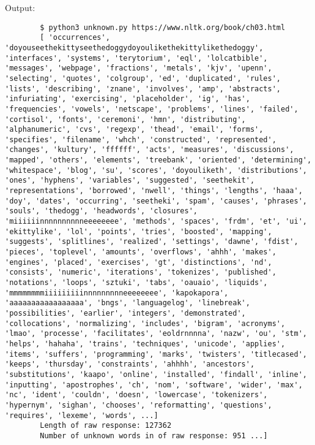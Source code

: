 \documentclass[12pt]{article}
\begin{document}
		Output:
		\begin{lstlisting}
		$ python3 unknown.py https://www.nltk.org/book/ch03.html
		[ 'occurrences', 'doyouseethekittyseethedoggydoyoulikethekittylikethedoggy', 'interfaces', 'systems', 'terytorium', 'eql', 'lolcatbible', 'messages', 'webpage', 'fractions', 'metals', 'kjv', 'upenn', 'selecting', 'quotes', 'colgroup', 'ed', 'duplicated', 'rules', 'lists', 'describing', 'znane', 'involves', 'amp', 'abstracts', 'infuriating', 'exercising', 'placeholder', 'ig', 'has', 'frequencies', 'vowels', 'netscape', 'problems', 'lines', 'failed', 'cortisol', 'fonts', 'ceremoni', 'hmn', 'distributing', 'alphanumeric', 'cvs', 'regexp', 'thead', 'email', 'forms', 'specifies', 'filename', 'whch', 'constructed', 'represented', 'changes', 'kultury', 'ffffff', 'acts', 'measures', 'discussions', 'mapped', 'others', 'elements', 'treebank', 'oriented', 'determining', 'whitespace', 'blog', 'su', 'scores', 'doyouliketh', 'distributions', 'ones', 'hyphens', 'variables', 'suggested', 'seethekit', 'representations', 'borrowed', 'nwell', 'things', 'lengths', 'haaa', 'doy', 'dates', 'occurring', 'seetheki', 'spam', 'causes', 'phrases', 'souls', 'thedogg', 'headwords', 'closures', 'miiiiiinnnnnnnnnneeeeeeee', 'methods', 'spaces', 'frdm', 'et', 'ui', 'ekittylike', 'lol', 'points', 'tries', 'boosted', 'mapping', 'suggests', 'splitlines', 'realized', 'settings', 'dawne', 'fdist', 'pieces', 'toplevel', 'amounts', 'overflows', 'ahhh', 'makes', 'engines', 'placed', 'exercises', 'gt', 'distinctions', 'nd', 'consists', 'numeric', 'iterations', 'tokenizes', 'published', 'notations', 'loops', 'sztuki', 'tabs', 'oauaio', 'liquids', 'mmmmmmmmiiiiiiiiinnnnnnnnneeeeeeee', 'kapokapora', 'aaaaaaaaaaaaaaaaa', 'bngs', 'languagelog', 'linebreak', 'possibilities', 'earlier', 'integers', 'demonstrated', 'collocations', 'normalizing', 'includes', 'bigram', 'acronyms', 'lmao', 'processe', 'facilitates', 'eoldrnnnna', 'nazw', 'ou', 'stm', 'helps', 'hahaha', 'trains', 'techniques', 'unicode', 'applies', 'items', 'suffers', 'programming', 'marks', 'twisters', 'titlecased', 'keeps', 'thursday', 'constraints', 'ahhhh', 'ancestors', 'substitutions', 'kaapo', 'online', 'installed', 'findall', 'inline', 'inputting', 'apostrophes', 'ch', 'nom', 'software', 'wider', 'max', 'nc', 'ident', 'couldn', 'doesn', 'lowercase', 'tokenizers', 'hypernym', 'sighan', 'chooses', 'reformatting', 'questions', 'requires', 'lexeme', 'words', ...]
		Length of raw response: 127362
		Number of unknown words in of raw response: 951 ...]
		\end{lstlisting}
	
\end{document}
